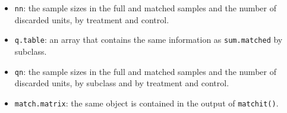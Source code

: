 \begin{itemize}
\item \texttt{nn}: the sample sizes in the full and matched samples
  and the number of discarded units, by treatment and control.
  
\item \texttt{q.table}: an array that contains the same information
  as \texttt{sum.matched} by subclass.
  
\item \texttt{qn}: the sample sizes in the full and matched
  samples and the number of discarded units, by subclass and by
  treatment and control.
\item \texttt{match.matrix}: the same object is contained in the
  output of {\tt matchit()}.
\end{itemize}

